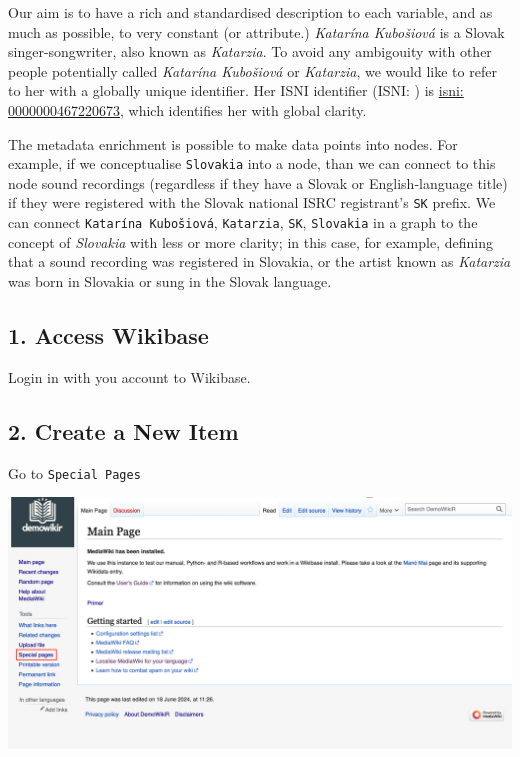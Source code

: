 \documentclass[
  letterpaper,
  DIV=11,
  numbers=noendperiod]{scrreprt}
\begin{document}
Our aim is to have a rich and standardised description to each variable,
and as much as possible, to very constant (or attribute.) \emph{Katarína
Kubošiová} is a Slovak singer-songwriter, also known as \emph{Katarzia}.
To avoid any ambigouity with other people potentially called
\emph{Katarína Kubošiová} or \emph{Katarzia}, we would like to refer to
her with a globally unique identifier. Her ISNI identifier (ISNI: ) is
\href{https://isni.org/isni/0000000467220673}{isni: 0000000467220673},
which identifies her with global clarity.

The metadata enrichment is possible to make data points into nodes. For
example, if we conceptualise \texttt{Slovakia} into a node, than we can
connect to this node sound recordings (regardless if they have a Slovak
or English-language title) if they were registered with the Slovak
national ISRC registrant's \texttt{SK} prefix. We can connect
\texttt{Katarína\ Kubošiová}, \texttt{Katarzia}, \texttt{SK},
\texttt{Slovakia} in a graph to the concept of \emph{Slovakia} with less
or more clarity; in this case, for example, defining that a sound
recording was registered in Slovakia, or the artist known as
\emph{Katarzia} was born in Slovakia or sung in the Slovak language.

\subsection{1. Access Wikibase}\label{access-wikibase}

Login in with you account to Wikibase.

\subsection{2. Create a New Item}\label{create-a-new-item}

Go to \texttt{Special\ Pages}

\begin{center}
\includegraphics{png/question_to_wikibase/wikidata_specialPages_2x1.png}
\end{center}
\end{document}
